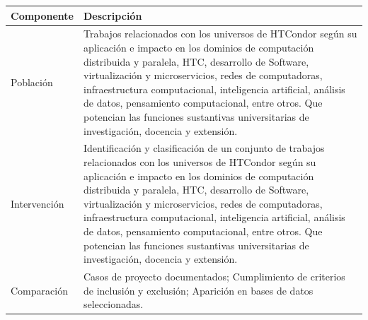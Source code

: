 \begin{table}[htbp]

	\centering
	\renewcommand{\arraystretch}{1.7}  %
	\setlength{\tabcolsep}{3pt}      %
	\vspace{10pt}                     %
	\begin{tabular}{|>{\arraybackslash}m{1.7cm}|>{\arraybackslash}m{6.3cm}|}
		\hline
		\textbf{Componente} & \textbf{Descripción}                                                                                                                                                                                                                                                                                                                                                                                                                                                                             \\

		\hline
		Población           & Trabajos relacionados con los universos de HTCondor según su aplicación e impacto en los dominios de computación distribuida y paralela, HTC, desarrollo de Software, virtualización y microservicios, redes de computadoras, infraestructura computacional, inteligencia artificial, análisis de datos, pensamiento computacional, entre otros. Que potencian las funciones sustantivas universitarias de investigación, docencia y extensión.                                                  \\

		\hline
		Intervención        & Identificación y clasificación de un conjunto de trabajos relacionados con los universos de HTCondor según su aplicación e impacto en los dominios de computación distribuida y paralela, HTC, desarrollo de Software, virtualización y microservicios, redes de computadoras, infraestructura computacional, inteligencia artificial, análisis de datos, pensamiento computacional, entre otros. Que potencian las funciones sustantivas universitarias de investigación, docencia y extensión. \\

		\hline
		Comparación         & Casos de proyecto documentados; Cumplimiento de criterios de inclusión y exclusión;
		Aparición en bases de datos seleccionadas.                                                                                                                                                                                                                                                                                                                                                                                                                                                                             \\


\end{tabular}
\end{table}
